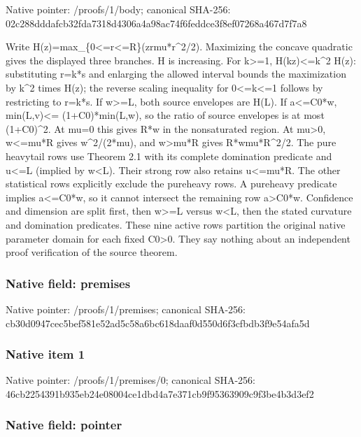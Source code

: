 \documentclass[10pt,a4paper]{article}
\begin{document}
Native pointer: /proofs/1/body; canonical SHA-256: 02c288dddafcb32fda7318d4\allowbreak{}306a4a98ac74f6feddce3f8e\allowbreak{}f07268a467d7f7a8


Write H(z)=max\_\{0<=r<=R\}(zrmu*r\textasciicircum{}2/2). Maximizing the concave quadratic gives the displayed three branches. H is increasing. For k>=1, H(kz)<=k\textasciicircum{}2 H(z): substituting r=k*s and enlarging the allowed interval bounds the maximization by k\textasciicircum{}2 times H(z); the reverse scaling inequality for 0<=k<=1 follows by restricting to r=k*s. If w>=L, both source envelopes are H(L). If a<=C0*w, min(L,v)<= (1+C0)*min(L,w), so the ratio of source envelopes is at most (1+C0)\textasciicircum{}2. At mu=0 this gives R*w in the nonsaturated region. At mu>0, w<=mu*R gives w\textasciicircum{}2/(2*mu), and w>mu*R gives R*wmu*R\textasciicircum{}2/2. The pure heavytail rows use Theorem 2.1 with its complete domination predicate and u<=L (implied by w<L). Their strong row also retains u<=mu*R. The other statistical rows explicitly exclude the pureheavy rows. A pureheavy predicate implies a<=C0*w, so it cannot intersect the remaining row a>C0*w. Confidence and dimension are split first, then w>=L versus w<L, then the stated curvature and domination predicates. These nine active rows partition the original native parameter domain for each fixed C0>0. They say nothing about an independent proof verification of the source theorem.


\subsubsection{Native field: premises}


Native pointer: /proofs/1/premises; canonical SHA-256: cb30d0947cec5bef581e52ad\allowbreak{}5c58a6bc618daaf0d550d6f3\allowbreak{}cfbdb3f9e54afa5d



\subsubsection{Native item 1}


Native pointer: /proofs/1/premises/0; canonical SHA-256: 46cb2254391b935eb24e0800\allowbreak{}4ce1dbd4a7e371cb9f953639\allowbreak{}09c9f3be4b3d3ef2



\subsubsection{Native field: pointer}
\end{document}
